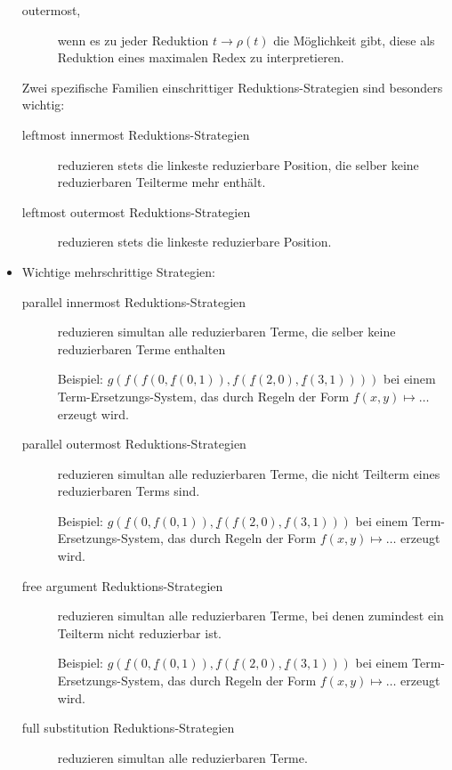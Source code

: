 \documentclass[
  a4paper,
  11pt,
]{scrartcl}
\begin{document}
\begin{itemize}
\begin{description}
      \item[outermost,] wenn es zu jeder Reduktion $t \rightarrow \rho(t)$ die
        Möglichkeit gibt, diese als Reduktion eines maximalen Redex zu
        interpretieren.
    \end{description}

    Zwei spezifische Familien einschrittiger Reduktions-Strategien sind
    besonders wichtig:
    \begin{description}
      \item[leftmost innermost Reduktions-Strategien] reduzieren stets die
        linkeste reduzierbare Position, die selber keine reduzierbaren Teilterme
        mehr enthält.
      \item[leftmost outermost Reduktions-Strategien] reduzieren stets die
        linkeste reduzierbare Position.
    \end{description}

  \item Wichtige mehrschrittige Strategien:
    \begin{description}
      \item[parallel innermost Reduktions-Strategien] reduzieren simultan alle
        reduzierbaren Terme, die selber keine reduzierbaren Terme enthalten

        Beispiel: $g(f(f(0, \underline{f}(0, 1)), f(\underline{f}(2, 0),
        \underline{f}(3,1))))$ bei einem Term-Ersetzungs-System, das durch
        Regeln der Form $f(x,y) \mapsto \dots$ erzeugt wird.

      \item[parallel outermost Reduktions-Strategien] reduzieren simultan alle
        reduzierbaren Terme, die nicht Teilterm eines reduzierbaren Terms sind.

        Beispiel: $g(\underline{f}(0, f(0, 1)), \underline{f}(f(2, 0), f(3,1)))$
        bei einem Term-Ersetzungs-System, das durch Regeln der Form $f(x,y)
        \mapsto \dots$ erzeugt wird.

      \item[free argument Reduktions-Strategien] reduzieren simultan alle
        reduzierbaren Terme, bei denen zumindest ein Teilterm nicht reduzierbar
        ist.

        Beispiel: $g(\underline{f}(0, \underline{f}(0, 1)), f(\underline{f}(2,
        0), \underline{f}(3,1)))$ bei einem Term-Ersetzungs-System, das durch
        Regeln der Form $f(x,y) \mapsto \dots$ erzeugt wird.

      \item[full substitution Reduktions-Strategien] reduzieren simultan alle
        reduzierbaren Terme.


\end{description}
\end{itemize}
\end{document}
